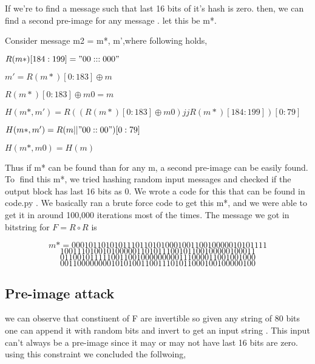 \documentclass[12 pt,a4paper]{article}
\begin{document}
If we're to find a message such that last 16 bits of it's hash is zero. then, we can find a second  pre-image for any message . let this be m*.

Consider message m2  = m*, m',where following holds,


\centerline{$R(m*)[184 : 199] = "00:::000"$}
\centerline{$m' = R(m*)[0 : 183] \oplus m$}
\centerline{$R(m*)[0 : 183] \oplus m0 = m$}
\centerline{$H(m*,m') = R((R(m*)[0 : 183] \oplus m0)jjR(m*)[184 : 199])[0 : 79]$}
\centerline{$H(m*,m') = R(m||"00::00")[0 : 79]$}
\centerline{$H(m*,m0) = H(m)$}


Thus if m* can be found than for any m, a second pre-image can be easily found.
To find this m*, we tried hashing random input messages and checked if the output block has last
16 bits as 0. We wrote a code for this that can be found in code.py . We basically ran a brute force
code to get this m*, and we were able to get it in around 100,000 iterations most of the times.
The message we got in bitstring for $F = R \circ R$ is

\[m* = 0001011010101110110101000100110010000010101111\]
\[	    1001110100101000001101011100101100100000100011\]
\[	    0110010111110011001000000000111000011001001000\]
\[	    0011000000001010100110011101011000100100000100\]


\subsection{Pre-image attack}
we can observe that constiuent of F  are invertible so given any string of 80 bits  one can append it with random bits and invert to get an input string .
This input can't always be a pre-image since it may or may not have last 16 bits are zero.
using this constraint we concluded the follwoing,
\end{document}
